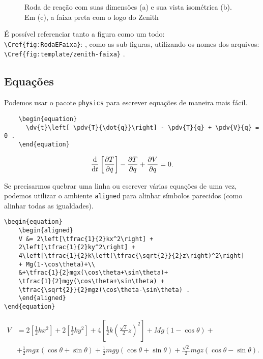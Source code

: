 \documentclass[brazilian, 11pt, oneside, a4paper]{article}
\begin{document}
\begin{figure}
    \caption{Roda de reação com suas dimensões (a) e sua vista isométrica (b). Em (c), a faixa preta com o logo do Zenith}
    \label{fig:RodaEFaixa}
\end{figure}


É possível referenciar tanto a figura como um todo: \\
\verb$\Cref{fig:RodaEFaixa}$: , como as sub-figuras, utilizando os nomes dos arquivos:\\ \verb$\Cref{fig:template/zenith-faixa}$ .

\subsection{Equações}

Podemos usar o pacote \verb$physics$ para escrever equações de maneira mais fácil.
{\small
\begin{verbatim}
    \begin{equation}
      \dv{t}\left[ \pdv{T}{\dot{q}}\right] - \pdv{T}{q} + \pdv{V}{q} = 0 .
    \end{equation}
\end{verbatim}
}
\begin{equation}
    \dv{t}\left[ \pdv{T}{\dot{q}}\right] - \pdv{T}{q} + \pdv{V}{q} = 0 .
\end{equation}

Se precisarmos quebrar uma linha ou escrever várias equações de uma vez, podemos utilizar o ambiente \verb$aligned$ para alinhar símbolos parecidos (como alinhar todas as igualdades).
{\small
\begin{verbatim}
\begin{equation}
    \begin{aligned}
    V &= 2\left[\tfrac{1}{2}kx^2\right] + 
    2\left[\tfrac{1}{2}ky^2\right] + 
    4\left[\tfrac{1}{2}k\left(\tfrac{\sqrt{2}}{2}z\right)^2\right] 
    + Mg(1-\cos\theta)+\\
    &+\tfrac{1}{2}mgx(\cos\theta+\sin\theta)+
    \tfrac{1}{2}mgy(\cos\theta+\sin\theta) +
    \tfrac{\sqrt{2}}{2}mgz(\cos\theta-\sin\theta) .
    \end{aligned}
\end{equation}
\end{verbatim}
}
\begin{equation}
    \begin{aligned}
    V &= 2\left[\tfrac{1}{2}kx^2\right] + 
    2\left[\tfrac{1}{2}ky^2\right] +
    4\left[\tfrac{1}{2}k\left(\tfrac{\sqrt{2}}{2}z\right)^2\right] 
    + Mg(1-\cos\theta)+\\
    &+\tfrac{1}{2}mgx(\cos\theta+\sin\theta)+
    \tfrac{1}{2}mgy(\cos\theta+\sin\theta) + 
    \tfrac{\sqrt{2}}{2}mgz(\cos\theta-\sin\theta) .
    \end{aligned}
\end{equation}
\end{document}
